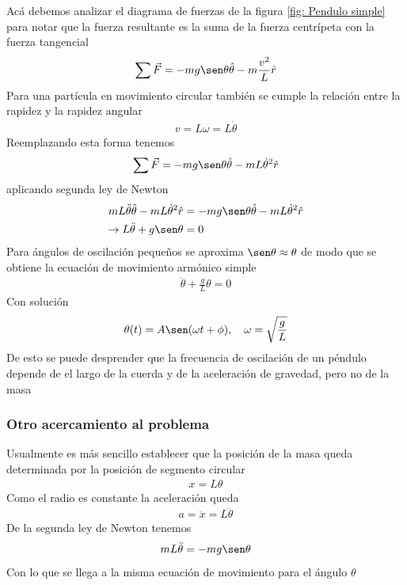 \documentclass[12pt]{article}
\begin{document}
Acá debemos analizar el diagrama de fuerzas de la figura \ref{fig: Pendulo simple} para notar que la fuerza resultante es la suma de la fuerza centrípeta con la fuerza tangencial
\begin{align*}
   \sum \vec{F} = -mg\sen\theta \hat{\theta} - m \frac{v^{2}}{L} \hat{r}
\end{align*}
Para una partícula en movimiento circular también se cumple la relación entre la rapidez y la rapidez angular
\begin{align*}
    v = L\omega = L \dot{\theta}
\end{align*}
Reemplazando esta forma tenemos
\begin{align*}
    \sum \vec{F} = -mg\sen\theta \hat{\theta} - m L\dot{\theta}^{2} \hat{r}
\end{align*}
aplicando segunda ley de Newton
\begin{align*}
     mL\ddot{\theta} \hat{\theta} - mL\dot{\theta}^{2} \hat{r} &= -mg\sen\theta \hat{\theta} - m L\dot{\theta}^{2} \hat{r}\\
     \rightarrow L\ddot{\theta} + g\sen\theta &= 0
\end{align*}
Para ángulos de oscilación pequeños se aproxima \(\sen\theta \approx \theta\) de modo que se obtiene la ecuación de movimiento armónico simple
\begin{align*}
    \ddot{\theta} + \frac{g}{L}\theta = 0
\end{align*}
Con solución
\begin{align*}
    \theta(t) = A \sen(\omega t + \phi) ,  \quad \omega = \sqrt{\frac{g}{L}}
\end{align*}
De esto se puede desprender que la frecuencia de oscilación de un péndulo depende de el largo de la cuerda y de la aceleración de gravedad, pero no de la masa

\subsubsection*{Otro acercamiento al problema}

Usualmente es más sencillo establecer que la posición de la masa queda determinada por la posición de segmento circular
\begin{align*}
    x = L \theta
\end{align*}
Como el radio es constante la aceleración queda
\begin{align*}
    a = \ddot{x} = L \ddot{\theta}
\end{align*}
De la segunda ley de Newton tenemos 
\begin{align*}
    mL\ddot{\theta} = -mg\sen\theta
\end{align*}
Con lo que se llega a la misma ecuación de movimiento para el ángulo \(\theta\)
\end{document}
